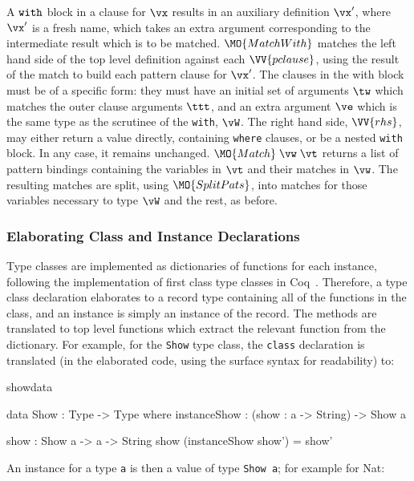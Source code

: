 A $\mathtt{with}$ block in a clause for $\vx$
results in an auxiliary definition $\vx'$, where $\vx'$ is a fresh name,
which takes an extra argument corresponding to the intermediate result which
is to be matched.
$\MO{MatchWith}$ matches the left hand side of the top level definition against
each $\VV{pclause}$, using the result of the match to build each pattern clause
for $\vx'$. 
The clauses in the with block must be of a specific form: they must have an initial
set of arguments $\tw$ which matches the outer clause arguments
$\ttt$, and an extra argument
$\ve$ which is the same type as the scrutinee of the \texttt{with}, $\vW$.
The right hand side, $\VV{rhs}$, may either return a value directly, containing 
\texttt{where} clauses, or be a nested \texttt{with} block. In any case, it
remains unchanged.
$\MO{Match}\;\vw\;\vt$ returns a list of pattern bindings containing
the variables in $\vt$ and their matches in $\vw$.
The resulting matches are split, using $\MO{SplitPats}$, into matches for those
variables necessary to type $\vW$ and the rest, as before.

\subsubsection{Elaborating Class and Instance Declarations}

Type classes are implemented as dictionaries of functions for each instance,
following the implementation of first class type classes in Coq~\cite{Sozeau2008}.
Therefore, a type class declaration elaborates to a record type containing all
of the functions in the class, and an instance is simply an instance of the
record. The methods are translated to top level functions which extract the
relevant function from the dictionary.  For example, for the \texttt{Show} type
class, the \texttt{class} declaration is translated (in the elaborated code,
using the surface \Idris{} syntax for readability)
to:

\begin{SaveVerbatim}{showdata}

data Show : Type -> Type where
    instanceShow : (show : a -> String) -> Show a

show : Show a -> a -> String
show (instanceShow show') = show'

\end{SaveVerbatim}

\noindent
An instance for a type \texttt{a} is then a value of type \texttt{Show a}; for example for Nat:

